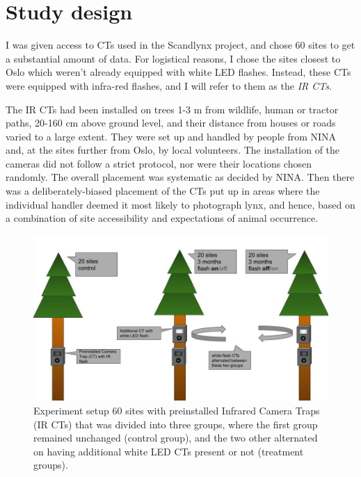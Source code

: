 \section{Study design} 

I was given access to CTs used in the Scandlynx project, and chose 60 sites to get a substantial amount of data.
For logistical reasons, I chose the sites closest to Oslo which weren't already equipped with white LED flashes. 
Instead, these CTs were equipped with infra-red flashes, and I will refer to them as the \emph{IR CTs}.


The IR CTs had been installed on trees 1-3 m from wildlife, human or tractor paths, 20-160 cm above ground level, and their distance from houses or roads varied to a large extent. %
They were set up and handled by people from NINA and, at the sites further from Oslo, by local volunteers. %
The installation of the cameras did not follow a strict protocol, nor were their locations chosen randomly. The overall placement was systematic as decided by NINA. 
Then there was a deliberately-biased placement of the CTs put up in areas where the individual handler deemed it most likely to photograph lynx, and hence, based on a combination of site accessibility and expectations of animal occurrence. %


\begin{figure}
    \begin{center}
    	\includegraphics[scale=0.4]{./img/experiment_setup.jpg} %
    \end{center}
\caption[The Experimental setup]
    	{Experiment setup %
    	 60 sites with preinstalled Infrared Camera Traps (IR CTs) that was divided into three groups, where the first group remained unchanged (control group), and the two other alternated on having additional white LED CTs present or not (treatment groups).}
    \label{fig:exp_set}
\end{figure} 



